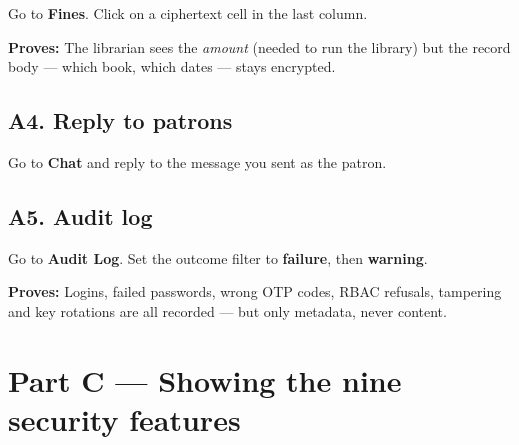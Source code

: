 \documentclass[11pt]{article}
\newcommand{\proof}[1]{\textcolor{ok}{\textbf{Proves:}} #1}
\begin{document}
Go to \textbf{Fines}. Click on a ciphertext cell in the last column.

\proof{The librarian sees the \emph{amount} (needed to run the library) but the
record body --- which book, which dates --- stays encrypted.}

\subsection*{A4. Reply to patrons}

Go to \textbf{Chat} and reply to the message you sent as the patron.

\subsection*{A5. Audit log}

Go to \textbf{Audit Log}. Set the outcome filter to \textbf{failure}, then
\textbf{warning}.

\proof{Logins, failed passwords, wrong OTP codes, RBAC refusals, tampering and
key rotations are all recorded --- but only metadata, never content.}

\section{Part C --- Showing the nine security features}
\end{document}
